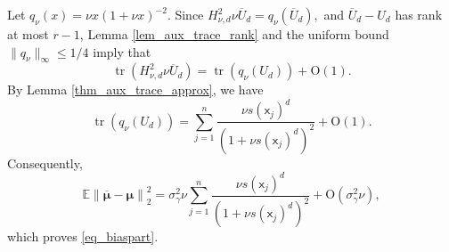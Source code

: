 \documentclass[11pt]{article}
\newcommand{\sfx}{\mathsf{x}}
\numberwithin{equation}{section}
\numberwithin{figure}{section}
\begin{document}
Let \(q_\nu(x)=\nu x(1+\nu x)^{-2}\). Since $H_{\nu,d}^2\nu\overline U_d=q_\nu(\overline U_d),$
and \(\overline U_d-U_d\) has rank at most \(r-1\), Lemma
\ref{lem_aux_trace_rank} and the uniform bound
\(\|q_\nu\|_\infty\leq 1/4\) imply that
\begin{equation*}
\operatorname{tr}\!\left(
H_{\nu,d}^2\nu\overline U_d
\right)
=
\operatorname{tr}\!\left(
q_\nu(U_d)
\right)
+
\mathrm{O}(1).
\end{equation*}
By Lemma \ref{thm_aux_trace_approx}, we have 
\begin{equation*}
\operatorname{tr}\!\left(
q_\nu(U_d)
\right)
=
\sum_{j=1}^{n}
\frac{\nu s(\sfx_j)^d}
{(1+\nu s(\sfx_j)^d)^{2}}
+
\mathrm{O}(1).
\end{equation*}
Consequently,
\begin{equation*}
\mathbb{E}\left\|
\overline{\bm{\mu}}-\bm{\mu}
\right\|_2^2
=
\sigma_\gamma^2\nu
\sum_{j=1}^{n}
\frac{\nu s(\sfx_j)^d}
{(1+\nu s(\sfx_j)^d)^{2}}
+
\mathrm{O}(\sigma_\gamma^2\nu),
\end{equation*}
which proves \eqref{eq_biaspart}.



%  
%  

\end{document}

